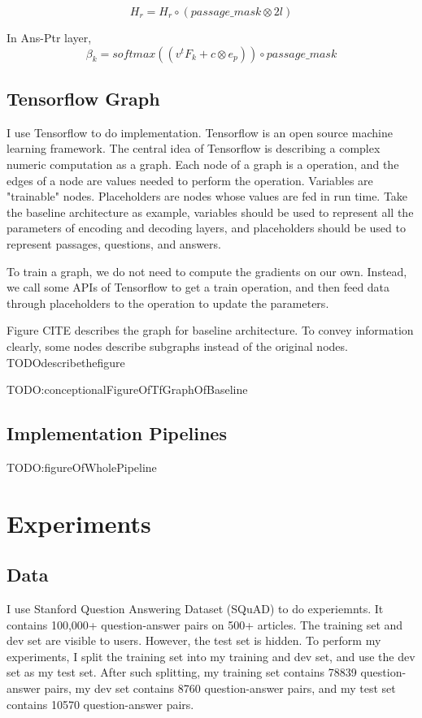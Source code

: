 \documentclass[modernstyle,12pt]{sjsuthesis}
\theoremstyle{definition}
\begin{document}
$$H_r = H_r \circ (passage\_mask \otimes 2l)$$

In Ans-Ptr layer,
$$\beta _k = softmax( (v^tF_k + c \otimes e_p) ) \circ passage\_mask$$


\section{Tensorflow Graph}
I use Tensorflow to do implementation. Tensorflow is an open source machine learning framework. The central idea of Tensorflow is describing a complex numeric computation as a graph. Each node of a graph is a operation, and the edges of a node are values needed to perform the operation. Variables are "trainable" nodes. Placeholders are nodes whose values are fed in run time. Take the baseline architecture as example, variables should be used to represent all the parameters of encoding and decoding layers, and placeholders should be used to represent passages, questions, and answers.

To train a graph, we do not need to compute the gradients on our own. Instead, we call some APIs of Tensorflow to get a train operation, and then feed data through placeholders to the operation to update the parameters.



Figure CITE describes the graph for baseline architecture. To convey information clearly, some nodes describe subgraphs instead of the original nodes. TODOdescribethefigure

TODO:conceptionalFigureOfTfGraphOfBaseline




\section{Implementation Pipelines}

TODO:figureOfWholePipeline

\chapter{Experiments}
\section{Data}
I use Stanford Question Answering Dataset (SQuAD) to do experiemnts.  It contains 100,000+ question-answer pairs on 500+ articles. The training set and dev set are visible to users. However, the test set is hidden. To perform my experiments, I split the training set into my training and dev set, and use the dev set as my test set. After such splitting, my training set contains 78839 question-answer pairs, my dev set contains 8760 question-answer pairs, and my test set contains 10570 question-answer pairs.
\end{document}
